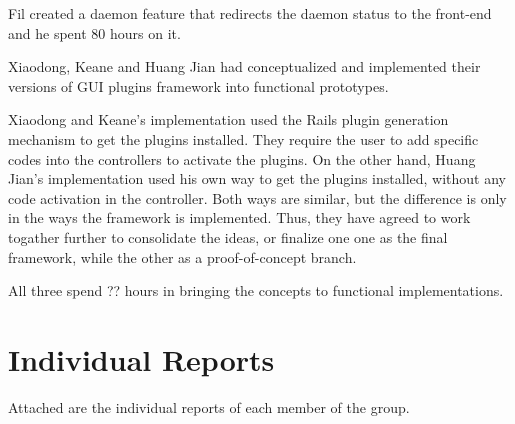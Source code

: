 \documentclass{article}
\begin{document}
Fil created a daemon feature that redirects the daemon status to the front-end and he spent 80 hours on it.

Xiaodong, Keane and Huang Jian had conceptualized and implemented their versions of GUI plugins framework into functional prototypes.

Xiaodong and Keane's implementation used the Rails plugin generation mechanism to get the plugins installed. They require the user to add specific codes into the controllers to activate the plugins. On the other hand, Huang Jian's implementation used his own way to get the plugins installed, without any code activation in the controller. Both ways are similar, but the difference is only in the ways the framework is implemented. Thus, they have agreed to work togather further to consolidate the ideas, or finalize one one as the final framework, while the other as a proof-of-concept branch. 

All three spend ?? hours in bringing the concepts to functional implementations. 
 
\section*{Individual Reports}

Attached are the individual reports of each member of the group. 



%



%

%

%

%
\end{document}
